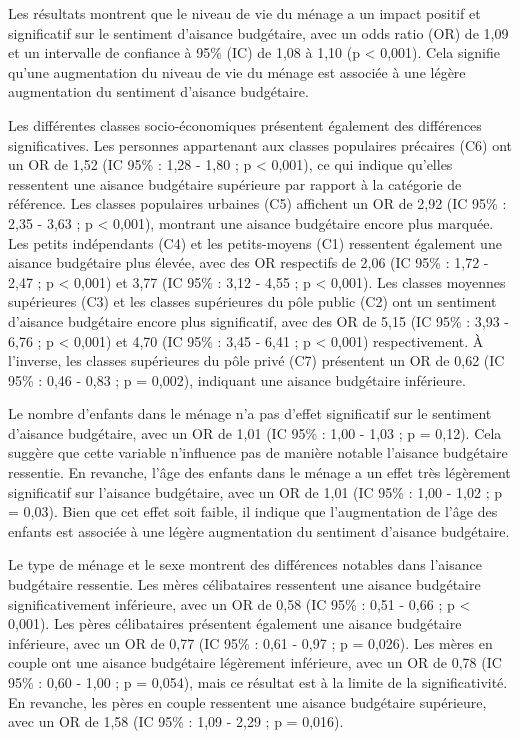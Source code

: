\documentclass[
  12pt,
]{book}
\begin{document}
Les résultats montrent que le niveau de vie du ménage a un impact
positif et significatif sur le sentiment d'aisance budgétaire, avec un
odds ratio (OR) de 1,09 et un intervalle de confiance à 95\% (IC) de
1,08 à 1,10 (p \textless{} 0,001). Cela signifie qu'une augmentation du
niveau de vie du ménage est associée à une légère augmentation du
sentiment d'aisance budgétaire.

Les différentes classes socio-économiques présentent également des
différences significatives. Les personnes appartenant aux classes
populaires précaires (C6) ont un OR de 1,52 (IC 95\% : 1,28 - 1,80 ; p
\textless{} 0,001), ce qui indique qu'elles ressentent une aisance
budgétaire supérieure par rapport à la catégorie de référence. Les
classes populaires urbaines (C5) affichent un OR de 2,92 (IC 95\% : 2,35
- 3,63 ; p \textless{} 0,001), montrant une aisance budgétaire encore
plus marquée. Les petits indépendants (C4) et les petits-moyens (C1)
ressentent également une aisance budgétaire plus élevée, avec des OR
respectifs de 2,06 (IC 95\% : 1,72 - 2,47 ; p \textless{} 0,001) et 3,77
(IC 95\% : 3,12 - 4,55 ; p \textless{} 0,001). Les classes moyennes
supérieures (C3) et les classes supérieures du pôle public (C2) ont un
sentiment d'aisance budgétaire encore plus significatif, avec des OR de
5,15 (IC 95\% : 3,93 - 6,76 ; p \textless{} 0,001) et 4,70 (IC 95\% :
3,45 - 6,41 ; p \textless{} 0,001) respectivement. À l'inverse, les
classes supérieures du pôle privé (C7) présentent un OR de 0,62 (IC 95\%
: 0,46 - 0,83 ; p = 0,002), indiquant une aisance budgétaire inférieure.

Le nombre d'enfants dans le ménage n'a pas d'effet significatif sur le
sentiment d'aisance budgétaire, avec un OR de 1,01 (IC 95\% : 1,00 -
1,03 ; p = 0,12). Cela suggère que cette variable n'influence pas de
manière notable l'aisance budgétaire ressentie. En revanche, l'âge des
enfants dans le ménage a un effet très légèrement significatif sur
l'aisance budgétaire, avec un OR de 1,01 (IC 95\% : 1,00 - 1,02 ; p =
0,03). Bien que cet effet soit faible, il indique que l'augmentation de
l'âge des enfants est associée à une légère augmentation du sentiment
d'aisance budgétaire.

Le type de ménage et le sexe montrent des différences notables dans
l'aisance budgétaire ressentie. Les mères célibataires ressentent une
aisance budgétaire significativement inférieure, avec un OR de 0,58 (IC
95\% : 0,51 - 0,66 ; p \textless{} 0,001). Les pères célibataires
présentent également une aisance budgétaire inférieure, avec un OR de
0,77 (IC 95\% : 0,61 - 0,97 ; p = 0,026). Les mères en couple ont une
aisance budgétaire légèrement inférieure, avec un OR de 0,78 (IC 95\% :
0,60 - 1,00 ; p = 0,054), mais ce résultat est à la limite de la
significativité. En revanche, les pères en couple ressentent une aisance
budgétaire supérieure, avec un OR de 1,58 (IC 95\% : 1,09 - 2,29 ; p =
0,016).
\end{document}
